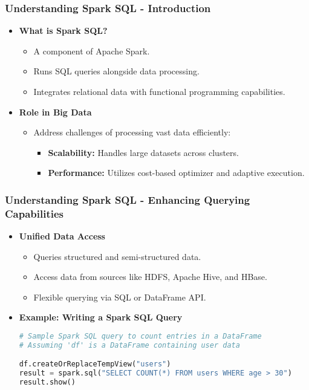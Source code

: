 \documentclass[aspectratio=169]{beamer}
\begin{document}
\begin{frame}[fragile]
    \frametitle{Understanding Spark SQL - Introduction}
    \begin{itemize}
        \item \textbf{What is Spark SQL?}
            \begin{itemize}
                \item A component of Apache Spark.
                \item Runs SQL queries alongside data processing.
                \item Integrates relational data with functional programming capabilities.
            \end{itemize}

        \item \textbf{Role in Big Data}
            \begin{itemize}
                \item Address challenges of processing vast data efficiently:
                \begin{itemize}
                    \item \textbf{Scalability:} Handles large datasets across clusters.
                    \item \textbf{Performance:} Utilizes cost-based optimizer and adaptive execution.
                \end{itemize}
            \end{itemize}
    \end{itemize}
\end{frame}

\begin{frame}[fragile]
    \frametitle{Understanding Spark SQL - Enhancing Querying Capabilities}
    \begin{itemize}
        \item \textbf{Unified Data Access}
            \begin{itemize}
                \item Queries structured and semi-structured data.
                \item Access data from sources like HDFS, Apache Hive, and HBase.
                \item Flexible querying via SQL or DataFrame API.
            \end{itemize}

        \item \textbf{Example: Writing a Spark SQL Query}
        \begin{lstlisting}[language=Python]
# Sample Spark SQL query to count entries in a DataFrame
# Assuming 'df' is a DataFrame containing user data

df.createOrReplaceTempView("users")
result = spark.sql("SELECT COUNT(*) FROM users WHERE age > 30")
result.show()
        \end{lstlisting}
    \end{itemize}
\end{frame}
\end{document}
